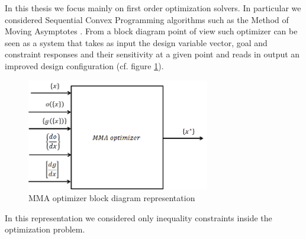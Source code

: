 In this thesis we focus mainly on first order optimization solvers. In particular we considered Sequential Convex Programming algorithms such as the Method of Moving Asymptotes \cite{svanberg1987method,svanberg2002class}. From a block diagram point of view such optimizer can be seen as a system that takes as input the design variable vector, goal and constraint responses and their sensitivity at a given point and reads in output an improved design configuration (cf. figure \ref{fig.2.5}).
\begin{figure}[ht]
\centering
\includegraphics[width=8cm]{images/Ch2/Optimizer_block}
\caption{MMA optimizer block diagram representation}
\label{fig.2.5}
\end{figure}
In this representation we considered only inequality constraints inside the optimization problem. 
